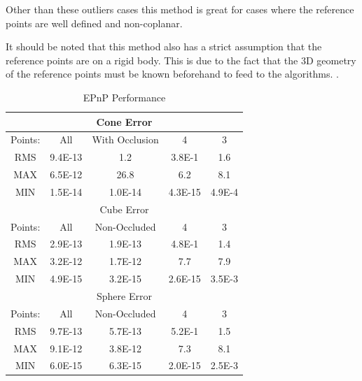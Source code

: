 \documentclass[journal]{IEEEtran}
\begin{document}
 Other than these outliers cases this method is great for cases where the reference points are well defined and non-coplanar. 
 
 It should be noted that this method also has a strict assumption that the reference points are on a rigid body. This is due to the fact that the 3D geometry of the reference points must be known beforehand to feed to the algorithms. . 
 

\begin{table}[h]
	\caption{EPnP Performance}
	\label{EPnP_Table}
	\centering
	\begin{tabular}{|c|c|c|c|c|}
		
		\hline
		\multicolumn{5}{|c|}{Cone Error} \\
		\hline
		Points: & All & With Occlusion & 4 & 3\\
		\hline
		RMS & 9.4E-13  & 1.2 & 3.8E-1 & 1.6\\
		MAX & 6.5E-12 & 26.8 & 6.2 & 8.1\\
		MIN & 1.5E-14 & 1.0E-14 & 4.3E-15 & 4.9E-4\\
		\hline
		\multicolumn{5}{|c|}{Cube Error} \\
		\hline
		Points: & All & Non-Occluded & 4 & 3\\
		\hline
		RMS & 2.9E-13 & 1.9E-13 & 4.8E-1 & 1.4\\
		MAX & 3.2E-12 & 1.7E-12 & 7.7 & 7.9\\
		MIN & 4.9E-15 & 3.2E-15 & 2.6E-15 & 3.5E-3\\
		\hline
		\multicolumn{5}{|c|}{Sphere Error} \\
		\hline
		Points: & All & Non-Occluded & 4 & 3\\
		\hline
		RMS & 9.7E-13 & 5.7E-13 & 5.2E-1 & 1.5\\
		MAX & 9.1E-12 & 3.8E-12 & 7.3 & 8.1\\
		MIN & 6.0E-15 & 6.3E-15 & 2.0E-15 & 2.5E-3\\
		\hline
		
		
	\end{tabular}
\end{table}
\end{document}
